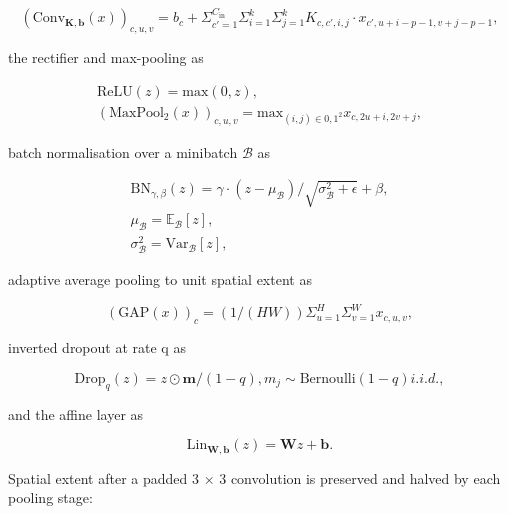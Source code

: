 \begin{equation}
\label{eq:62}
( \mathrm{Conv}_{\mathbf{K},\mathbf{b}}(x) )_{c,u,v} = b_c + \Sigma _{c'=1}^{C_{\mathrm{in}}} \Sigma _{i=1}^{k} \Sigma _{j=1}^{k} K_{c,c',i,j} \cdot x_{c', u+i-p-1, v+j-p-1},
\end{equation}

the rectifier and max-pooling as

\begin{equation}
\label{eq:63}
\begin{aligned}
\mathrm{ReLU}(z) = \mathrm{max}(0, z), \\
( \mathrm{MaxPool}_2(x) )_{c,u,v} = \mathrm{max}_{(i,j) \in {0,1}^{2}} x_{c, 2u+i, 2v+j},
\end{aligned}
\end{equation}

batch normalisation  over a minibatch $\mathcal{B}$ as

\begin{equation}
\label{eq:64}
\begin{aligned}
\mathrm{BN}_{\gamma ,\beta }(z) = \gamma \cdot ( z - \mu _{\mathcal{B}} ) / \sqrt{\sigma _{\mathcal{B}}^{2} + \epsilon} + \beta , \\
\mu _{\mathcal{B}} = \mathbb{E}_{\mathcal{B}}[z], \\
\sigma _{\mathcal{B}}^{2} = \mathrm{Var}_{\mathcal{B}}[z],
\end{aligned}
\end{equation}

adaptive average pooling to unit spatial extent as

\begin{equation}
\label{eq:65}
( \mathrm{GAP}(x) )_c = (1/(HW)) \Sigma _{u=1}^{H} \Sigma _{v=1}^{W} x_{c,u,v},
\end{equation}

inverted dropout  at rate q as

\begin{equation}
\label{eq:66}
\mathrm{Drop}_q(z) = z \odot \mathbf{m} / (1 - q), m_j \sim \mathrm{Bernoulli}(1 - q) i.i.d.,
\end{equation}

and the affine layer as

\begin{equation}
\label{eq:67}
\mathrm{Lin}_{\mathbf{W},\mathbf{b}}(z) = \mathbf{W} z + \mathbf{b}.
\end{equation}

Spatial extent after a padded 3 $\times$ 3 convolution is preserved and halved by each pooling stage:

